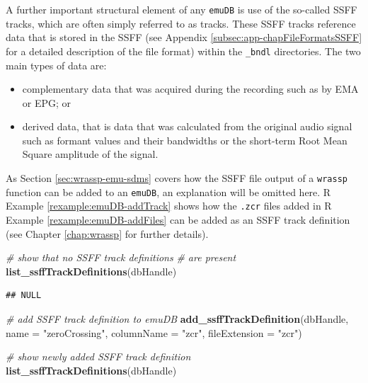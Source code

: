 \documentclass[]{book}
\newenvironment{Shaded}{\begin{snugshade}}{\end{snugshade}}
\newcommand{\CommentTok}[1]{\textcolor[rgb]{0.56,0.35,0.01}{\textit{#1}}}
\newcommand{\DataTypeTok}[1]{\textcolor[rgb]{0.13,0.29,0.53}{#1}}
\newcommand{\KeywordTok}[1]{\textcolor[rgb]{0.13,0.29,0.53}{\textbf{#1}}}
\newcommand{\NormalTok}[1]{#1}
\newcommand{\StringTok}[1]{\textcolor[rgb]{0.31,0.60,0.02}{#1}}
\providecommand{\tightlist}{%
  \setlength{\itemsep}{0pt}\setlength{\parskip}{0pt}}
\theoremstyle{definition}
\theoremstyle{definition}
\theoremstyle{definition}
\theoremstyle{remark}
\begin{document}
A further important structural element of any \texttt{emuDB} is use of
the so-called SSFF tracks, which are often simply referred to as tracks.
These SSFF tracks reference data that is stored in the SSFF (see
Appendix \ref{subsec:app-chapFileFormatsSSFF} for a detailed description
of the file format) within the \texttt{\_bndl} directories. The two main
types of data are:

\begin{itemize}
\tightlist
\item
  complementary data that was acquired during the recording such as by
  EMA or EPG; or
\item
  derived data, that is data that was calculated from the original audio
  signal such as formant values and their bandwidths or the short-term
  Root Mean Square amplitude of the signal.
\end{itemize}

As Section \ref{sec:wrassp-emu-sdms} covers how the SSFF file output of
a \texttt{wrassp} function can be added to an \texttt{emuDB}, an
explanation will be omitted here. R Example
\ref{rexample:emuDB-addTrack} shows how the \texttt{.zcr} files added in
R Example \ref{rexample:emuDB-addFiles} can be added as an SSFF track
definition (see Chapter \ref{chap:wrassp} for further details).

\begin{Shaded}
\begin{Highlighting}[]
\CommentTok{# show that no SSFF track definitions}
\CommentTok{# are present}
\KeywordTok{list_ssffTrackDefinitions}\NormalTok{(dbHandle)}
\end{Highlighting}
\end{Shaded}

\begin{verbatim}
## NULL
\end{verbatim}

\begin{Shaded}
\begin{Highlighting}[]
\CommentTok{# add SSFF track definition to emuDB}
\KeywordTok{add_ssffTrackDefinition}\NormalTok{(dbHandle,}
                        \DataTypeTok{name =} \StringTok{"zeroCrossing"}\NormalTok{,}
                        \DataTypeTok{columnName =} \StringTok{"zcr"}\NormalTok{,}
                        \DataTypeTok{fileExtension =} \StringTok{"zcr"}\NormalTok{)}

\CommentTok{# show newly added SSFF track definition}
\KeywordTok{list_ssffTrackDefinitions}\NormalTok{(dbHandle)}
\end{Highlighting}
\end{Shaded}
\end{document}
